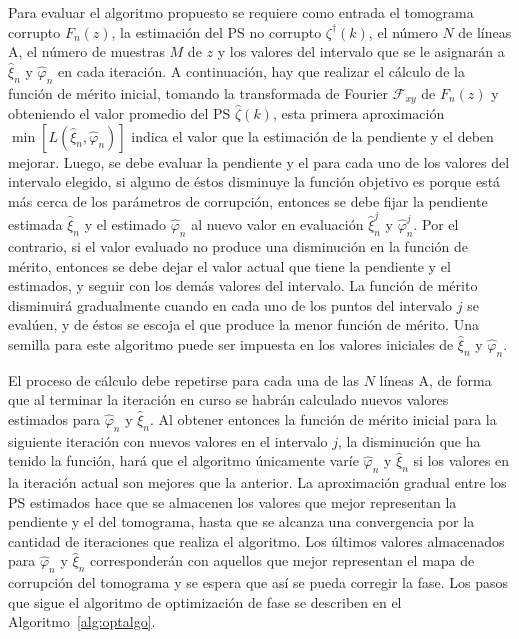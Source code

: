 Para evaluar el algoritmo propuesto se requiere como entrada el tomograma corrupto $F_n(z)$, la estimación del PS no corrupto $\zeta^\dagger(k)$, el número $N$ de líneas A, el número de muestras $M$ de $z$ y los valores del intervalo que se le asignarán a $\hat{\xi}_n$ y $\hat{\varphi}_n$ en cada iteración. A continuación, hay que realizar el cálculo de la función de mérito inicial, tomando la transformada de Fourier $\mathscr{F}_{xy}$ de $F_n(z)$ y obteniendo el valor promedio del PS $\hat{\zeta}(k)$, esta primera aproximación $\min[L(\hat{\xi}_n,\hat{\varphi}_n)]$ indica el valor que la estimación de la pendiente y el \offset deben mejorar. Luego, se debe evaluar la pendiente y el \offset para cada uno de los valores del intervalo elegido, si alguno de éstos disminuye la función objetivo es porque está más cerca de los parámetros de corrupción, entonces se debe fijar la pendiente estimada $\hat{\xi}_n$ y el \offset estimado $\hat{\varphi}_n$ al nuevo valor en evaluación $\hat{\xi}^j_n$ y $\hat{\varphi}^j_n$. Por el contrario, si el valor evaluado no produce una disminución en la función de mérito, entonces se debe dejar el valor actual que tiene la pendiente y el \offset estimados, y seguir con los demás valores del intervalo. La función de mérito disminuirá gradualmente cuando en cada uno de los puntos del intervalo $j$ se evalúen, y de éstos se escoja el que produce la menor función de mérito. Una semilla para este algoritmo puede ser impuesta en los valores iniciales de $\hat{\xi}_n$ y $\hat{\varphi}_n$.

El proceso de cálculo debe repetirse para cada una de las $N$ líneas A, de forma que al terminar la iteración en curso se habrán calculado nuevos valores estimados para $\hat{\varphi}_n$ y $\hat{\xi}_n$. Al obtener entonces la función de mérito inicial para la siguiente iteración con nuevos valores en el intervalo $j$, la disminución que ha tenido la función, hará que el algoritmo únicamente varíe $\hat{\varphi}_n$ y $\hat{\xi}_n$ si los valores en la iteración actual son mejores que la anterior. La aproximación gradual entre los PS estimados hace que se almacenen los valores que mejor representan la pendiente y el \offset del tomograma, hasta que se alcanza una convergencia por la cantidad de iteraciones que realiza el algoritmo. Los últimos valores almacenados para $\hat{\varphi}_n$ y $\hat{\xi}_n$ corresponderán con aquellos que mejor representan el mapa de corrupción del tomograma y se espera que así se pueda corregir la fase. Los pasos que sigue el algoritmo de optimización de fase se describen en el Algoritmo~\ref{alg:optalgo}.

